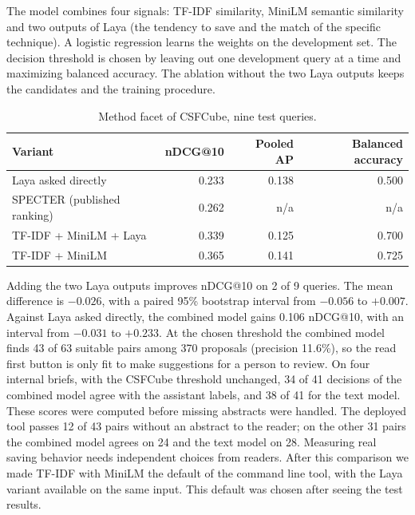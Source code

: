 \documentclass[11pt,a4paper]{article}
\begin{document}
The model combines four signals: TF-IDF similarity, MiniLM semantic similarity and two outputs of Laya (the tendency to save and the match of the specific technique). A logistic regression learns the weights on the development set. The decision threshold is chosen by leaving out one development query at a time and maximizing balanced accuracy. The ablation without the two Laya outputs keeps the candidates and the training procedure.
\begin{table}[htbp]\centering
\begin{tabular}{@{}lrrr@{}}\toprule
Variant & nDCG@10 & Pooled AP & Balanced accuracy\\\midrule
Laya asked directly & 0.233 & 0.138 & 0.500\\
SPECTER (published ranking) & 0.262 & n/a & n/a\\
TF-IDF + MiniLM + Laya & 0.339 & 0.125 & 0.700\\
TF-IDF + MiniLM & 0.365 & 0.141 & 0.725\\\bottomrule
\end{tabular}\caption{Method facet of CSFCube, nine test queries.}\label{tab:csfcube}\end{table}
Adding the two Laya outputs improves nDCG@10 on 2 of 9 queries. The mean difference is $-0.026$, with a paired 95\% bootstrap interval from $-0.056$ to $+0.007$. Against Laya asked directly, the combined model gains 0.106 nDCG@10, with an interval from $-0.031$ to $+0.233$. At the chosen threshold the combined model finds 43 of 63 suitable pairs among 370 proposals (precision 11.6\%), so the read first button is only fit to make suggestions for a person to review. On four internal briefs, with the CSFCube threshold unchanged, 34 of 41 decisions of the combined model agree with the assistant labels, and 38 of 41 for the text model. These scores were computed before missing abstracts were handled. The deployed tool passes 12 of 43 pairs without an abstract to the reader; on the other 31 pairs the combined model agrees on 24 and the text model on 28. Measuring real saving behavior needs independent choices from readers. After this comparison we made TF-IDF with MiniLM the default of the command line tool, with the Laya variant available on the same input. This default was chosen after seeing the test results.
\end{document}
